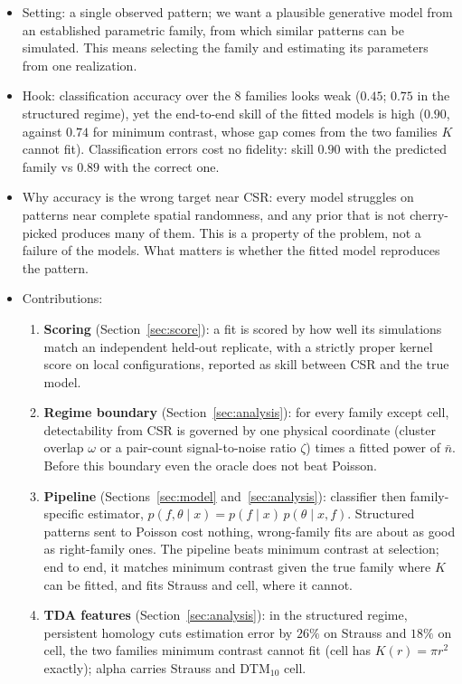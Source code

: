 \documentclass[twoside]{article}
\newcommand{\nb}{\bar n}
\begin{document}
\begin{itemize}
  \item Setting: a single observed pattern; we want a plausible generative model from an established parametric
        family, from which similar patterns can be simulated. This means selecting the family and estimating its
        parameters from one realization.
  \item Hook: classification accuracy over the 8 families looks weak ($0.45$; $0.75$ in the structured regime), yet the
        end-to-end skill of the fitted models is high ($0.90$, against $0.74$ for minimum contrast, whose gap comes
        from the two families $K$ cannot fit). Classification errors cost no fidelity: skill $0.90$ with the
        predicted family vs $0.89$ with the correct one.
  \item Why accuracy is the wrong target near CSR: every model struggles on patterns near complete spatial randomness,
        and any prior that is not cherry-picked produces many of them. This is a property of the problem, not a
        failure of the models. What matters is whether the fitted model reproduces the pattern.
  \item Contributions:
  \begin{enumerate}
    \item \textbf{Scoring} (Section~\ref{sec:score}): a fit is scored by how well its simulations match an independent held-out
          replicate, with a strictly proper kernel score on local configurations, reported as skill between CSR
          and the true model.
    \item \textbf{Regime boundary} (Section~\ref{sec:analysis}): for every family except cell, detectability from CSR is governed by one
          physical coordinate (cluster overlap $\omega$ or a pair-count signal-to-noise ratio $\zeta$) times a fitted
          power of $\nb$. Before this boundary even the oracle does not beat Poisson.
    \item \textbf{Pipeline} (Sections~\ref{sec:model} and~\ref{sec:analysis}): classifier then family-specific estimator,
          $p(f,\theta\mid x)=p(f\mid x)\,p(\theta\mid x,f)$. Structured patterns sent to Poisson cost nothing,
          wrong-family fits are about as good as right-family ones. The pipeline beats minimum contrast at
          selection; end to end, it matches minimum contrast given the true family where $K$ can be fitted, and
          fits Strauss and cell, where it cannot.
    \item \textbf{TDA features} (Section~\ref{sec:analysis}): in the structured regime, persistent homology cuts
          estimation error by $26\%$ on Strauss and $18\%$ on cell, the two families minimum contrast cannot fit
          (cell has $K(r)=\pi r^2$ exactly); alpha carries Strauss and DTM$_{10}$ cell.
  \end{enumerate}
\end{itemize}
\end{document}
